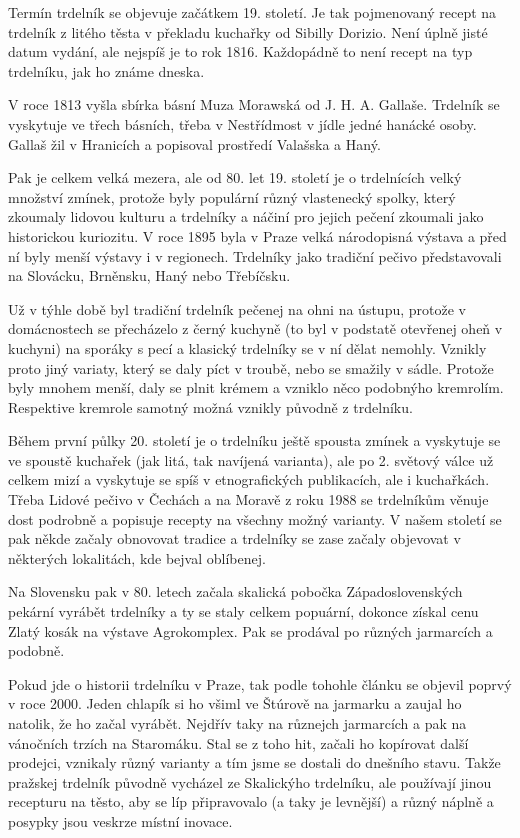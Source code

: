 Termín trdelník se objevuje začátkem 19. století. Je tak pojmenovaný recept na
trdelník z litého těsta v překladu kuchařky od Sibilly Dorizio. Není úplně
jisté datum vydání, ale nejspíš je to rok 1816. Každopádně to není recept na
typ trdelníku, jak ho známe dneska.

V roce 1813 vyšla sbírka básní Muza Morawská od J. H. A. Gallaše. Trdelník se
vyskytuje ve třech básních, třeba v Nestřídmost v jídle jedné hanácké osoby.
Gallaš žil v Hranicích a popisoval prostředí Valašska a Haný.

Pak je celkem velká mezera, ale od 80. let 19. století je o trdelnících velký
množství zmínek, protože byly populární různý vlastenecký spolky, který
zkoumaly lidovou kulturu a trdelníky a náčiní pro jejich pečení zkoumali jako
historickou kuriozitu. V roce 1895 byla v Praze velká národopisná výstava a
před ní byly menší výstavy i v regionech. Trdelníky jako tradiční pečivo
představovali na Slovácku, Brněnsku, Haný nebo Třebíčsku.

Už v týhle době byl tradiční trdelník pečenej na ohni na ústupu, protože v
domácnostech se přecházelo z černý kuchyně (to byl v podstatě otevřenej oheň v
kuchyni) na sporáky s pecí a klasický trdelníky se v ní dělat nemohly. Vznikly
proto jiný variaty, který se daly píct v troubě, nebo se smažily v sádle.
Protože byly mnohem menší, daly se plnit krémem a vzniklo něco podobnýho
kremrolím. Respektive kremrole samotný možná vznikly původně z trdelníku.

Během první půlky 20. století je o trdelníku ještě spousta zmínek a vyskytuje
se ve spoustě kuchařek (jak litá, tak navíjená varianta), ale po 2. světový
válce už celkem mizí a vyskytuje se spíš v etnografických publikacích, ale i
kuchařkách. Třeba Lidové pečivo v Čechách a na Moravě z roku 1988 se trdelníkům
věnuje dost podrobně a popisuje recepty na všechny možný varianty. V našem
století se pak někde začaly obnovovat tradice a trdelníky se zase začaly
objevovat v některých lokalitách, kde bejval oblíbenej.

Na Slovensku pak v 80. letech začala skalická pobočka Západoslovenských pekární
vyrábět trdelníky a ty se staly celkem popuární, dokonce získal cenu Zlatý
kosák na výstave Agrokomplex. Pak se prodával po různých jarmarcích a podobně.

Pokud jde o historii trdelníku v Praze, tak podle tohohle článku se objevil
poprvý v roce 2000. Jeden chlapík si ho všiml ve Štúrově na jarmarku a zaujal
ho natolik, že ho začal vyrábět. Nejdřív taky na různejch jarmarcích a pak na
vánočních trzích na Staromáku. Stal se z toho hit, začali ho kopírovat další
prodejci, vznikaly různý varianty a tím jsme se dostali do dnešního stavu.
Takže pražskej trdelník původně vycházel ze Skalickýho trdelníku, ale používají
jinou recepturu na těsto, aby se líp připravovalo (a taky je levnější) a různý
náplně a posypky jsou veskrze místní inovace.


